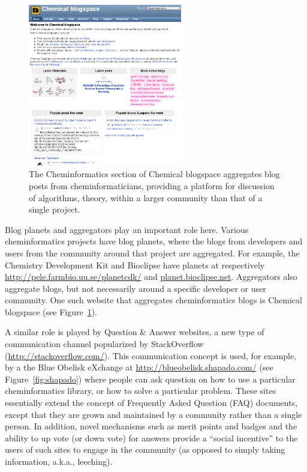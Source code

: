 \documentclass[11pt]{book}
\begin{document}
\begin{figure}[bt]
\begin{center}
\includegraphics[width=0.6\textwidth]{graphics/cb.png}
\end{center}
\caption{The Cheminformatics section of Chemical blogspace
aggregates blog posts from cheminformaticians, providing
a platform for discussion of algorithms, theory, within
a larger community than that of a single project.}
\label{fig:cb}
\end{figure}

Blog planets and aggregators play an important role here.
Various cheminformatics projects have blog planets, where
the blogs from developers and users from the community
around that project are aggregated. For example, the
Chemistry Development Kit and Bioclipse have planets
at respectively \url{http://pele.farmbio.uu.se/planetcdk/} and
\url{planet.bioclipse.net}.
Aggregators also aggregate blogs, but not necessarily around
a specific developer or user community. One such website
that aggregates cheminformatics blogs is Chemical blogspace
(see Figure~\ref{fig:cb}).

A similar role is played by Question \& Answer websites, a new
type of communication channel popularized by StackOverflow
(\url{http://stackoverflow.com/}). This communication
concept is used, for example, by a the Blue Obelisk
eXchange at \url{http://blueobelisk.shapado.com/}
(see Figure~\ref{fig:shapado}) where
people can ask question on how to use a particular
cheminformatics library, or how to solve a particular
problem. These sites essentially extend the concept of Frequently
Asked Question (FAQ) documents, except that they are grown and
maintained by a community rather than a single person. In addition,
novel mechanisms such as merit points and badges and the ability to
up vote (or down vote) for answers provide a ``social incentive'' to
the users of such sites to engage in the community (as opposed to
simply taking information, a.k.a., leeching).
\end{document}
